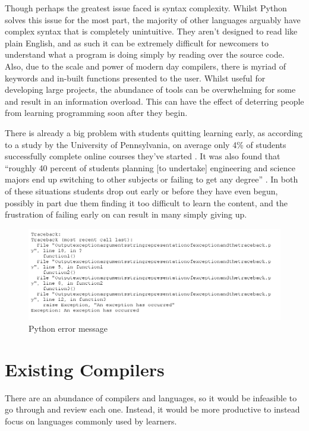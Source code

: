 \documentclass[
]{report}
\begin{document}
Though perhaps the greatest issue faced is syntax complexity. Whilst
Python solves this issue for the most part, the majority of other
languages arguably have complex syntax that is completely unintuitive.
They aren't designed to read like plain English, and as such it can be
extremely difficult for newcomers to understand what a program is doing
simply by reading over the source code. Also, due to the scale and power
of modern day compilers, there is myriad of \glspl{keyword} and in-built
functions presented to the user. Whilst useful for developing large
projects, the abundance of tools can be overwhelming for some and result
in an information overload. This can have the effect of deterring people
from learning programming soon after they begin.

There is already a big problem with students quitting learning early, as
according to a study by the University of Pennsylvania, on average only
4\% of students successfully complete online courses they've started
\cite{upenn-report}. It was also found that ``roughly 40 percent of students
planning [to undertake] engineering and science majors end up switching to other
subjects or failing to get any degree'' \cite{nytimes-article}. In both of these
situations students drop out early or before they have even begun,
possibly in part due them finding it too difficult to learn the
content, and the frustration of failing early on can result in many
simply giving up.

\begin{figure}
	\centering
	\includegraphics[width=\textwidth]{error-message}
	\caption{Python error message \cite{hackernoon-article}}
	\label{fig:python-error-example}
\end{figure}

\section{Existing Compilers}
There are an abundance of compilers and languages, so it would be
infeasible to go through and review each one. Instead, it would be more
productive to instead focus on languages commonly used by learners.
\end{document}
